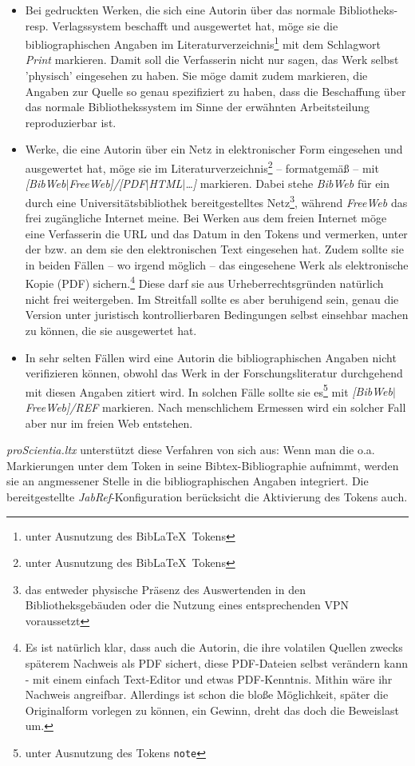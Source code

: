 \begin{itemize}
  \item Bei gedruckten Werken, die sich eine Autorin über das normale Bibliotheks- resp. Verlagssystem beschafft und  ausgewertet hat, möge sie die bibliographischen Angaben im Literaturverzeichnis\footnote{unter Ausnutzung des Bib\LaTeX\ Tokens } mit dem Schlagwort \emph{Print} markieren. Damit soll die Verfasserin nicht nur sagen, das Werk selbst 'physisch' eingesehen zu haben. Sie möge damit zudem markieren, die Angaben zur Quelle so genau spezifiziert zu haben, dass die Beschaffung über das normale Bibliothekssystem im Sinne der erwähnten Arbeitsteilung reproduzierbar ist.
  \item Werke, die eine Autorin über ein Netz in elektronischer Form eingesehen und ausgewertet hat, möge sie im Literaturverzeichnis\footnote{unter Ausnutzung des Bib\LaTeX\ Tokens }  -- formatgemäß -- mit \emph{[BibWeb$|$FreeWeb]/[PDF$|$HTML$|$\ldots]} markieren. Dabei stehe \emph{BibWeb} für ein durch eine Universitätsbibliothek bereitgestelltes Netz\footnote{das entweder physische Präsenz des Auswertenden in den Bibliotheksgebäuden oder die Nutzung eines entsprechenden VPN voraussetzt}, während \emph{FreeWeb} das frei zugängliche Internet meine. Bei Werken aus dem freien Internet möge eine Verfasserin die URL und das Datum in den Tokens  und  vermerken, unter der bzw. an dem sie den elektronischen Text eingesehen hat. Zudem sollte sie in beiden Fällen -- wo irgend möglich -- das eingesehene Werk als elektronische Kopie (PDF) sichern.\footnote{Es ist natürlich klar, dass auch die Autorin, die ihre volatilen Quellen zwecks späterem Nachweis als PDF sichert, diese PDF-Dateien selbst verändern kann - mit einem einfach Text-Editor und etwas PDF-Kenntnis. Mithin wäre ihr Nachweis angreifbar. Allerdings ist schon die bloße Möglichkeit, später die Originalform vorlegen zu können, ein Gewinn, dreht das doch die Beweislast um.} Diese darf sie aus Urheberrechtsgründen natürlich nicht frei weitergeben. Im Streitfall sollte es aber beruhigend sein, genau die Version unter juristisch kontrollierbaren Bedingungen selbst einsehbar machen zu können, die sie ausgewertet hat.
  \item In sehr selten Fällen wird eine Autorin die bibliographischen Angaben nicht verifizieren können, obwohl das Werk in der Forschungsliteratur durchgehend mit diesen Angaben zitiert wird. In solchen Fälle sollte sie es\footnote{unter Ausnutzung des Tokens \texttt{note}} mit \emph{[BibWeb$|$FreeWeb]/REF} markieren. Nach menschlichem Ermessen wird ein solcher Fall aber nur im freien Web entstehen.
\end{itemize}

\emph{proScientia.ltx} unterstützt diese Verfahren von sich aus: Wenn man die o.a. Markierungen unter dem Token  in seine Bibtex-Bibliographie aufnimmt, werden sie an angmessener Stelle in die bibliographischen Angaben integriert. Die bereitgestellte \emph{JabRef}-Konfiguration berücksicht die Aktivierung des Tokens auch.
%
